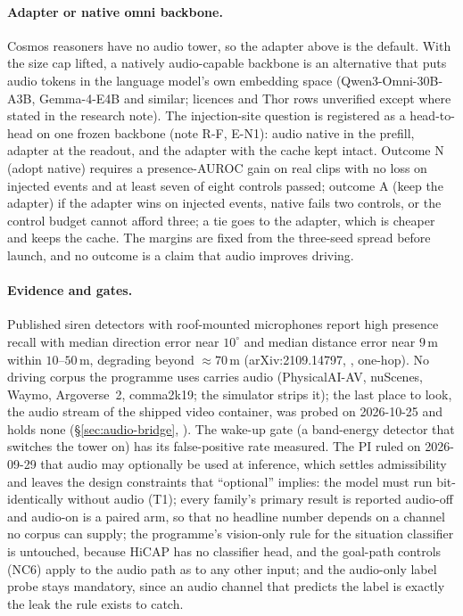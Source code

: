 \paragraph{Adapter or native omni backbone.}
Cosmos reasoners have no audio tower, so the adapter above is the default. With the size cap lifted, a natively audio-capable backbone is an alternative that puts audio tokens in the language model's own embedding space (Qwen3-Omni-30B-A3B, Gemma-4-E4B and similar; licences and Thor rows unverified except where stated in the research note). The injection-site question is registered as a head-to-head on one frozen backbone (note R-F, E-N1): audio native in the prefill, adapter at the readout, and the adapter with the cache kept intact. Outcome N (adopt native) requires a presence-AUROC gain on real clips with no loss on injected events and at least seven of eight controls passed; outcome A (keep the adapter) if the adapter wins on injected events, native fails two controls, or the control budget cannot afford three; a tie goes to the adapter, which is cheaper and keeps the cache. The margins are fixed from the three-seed spread before launch, and no outcome is a claim that audio improves driving.

\paragraph{Evidence and gates.}
Published siren detectors with roof-mounted microphones report high presence recall with median direction error near $10^\circ$ and median distance error near $9$\,m within $10$--$50$\,m, degrading beyond $\approx70$\,m (arXiv:2109.14797, \evP, one-hop). No driving corpus the programme uses carries audio (PhysicalAI-AV, nuScenes, Waymo, Argoverse~2, comma2k19; the simulator strips it); the last place to look, the audio stream of the shipped video container, was probed on 2026-10-25 and holds none (\S\ref{sec:audio-bridge}, \evM). The wake-up gate (a band-energy detector that switches the tower on) has its false-positive rate measured. The PI ruled on 2026-09-29 that audio may optionally be used at inference, which settles admissibility and leaves the design constraints that ``optional'' implies: the model must run bit-identically without audio (T1); every family's primary result is reported audio-off and audio-on is a paired arm, so that no headline number depends on a channel no corpus can supply; the programme's vision-only rule for the situation classifier is untouched, because HiCAP has no classifier head, and the goal-path controls (NC6) apply to the audio path as to any other input; and the audio-only label probe stays mandatory, since an audio channel that predicts the label is exactly the leak the rule exists to catch.
